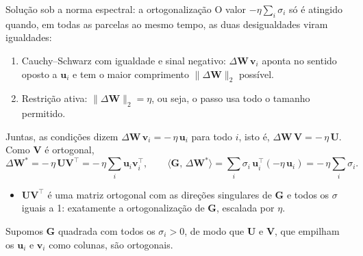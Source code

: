 \documentclass[aspectratio=169,xcolor=dvipsnames]{beamer}
\begin{document}
  \begin{frame}{Solução sob a norma espectral: a ortogonalização}
    O valor $-\eta\sum_{i}\sigma_{i}$ só é atingido quando, em \alert{todas} as parcelas ao mesmo tempo,
    as duas desigualdades viram igualdades:
    \begin{enumerate}
      \item Cauchy--Schwarz com igualdade e sinal negativo: $\Delta \mathbf{W}\,\mathbf{v}_{i}$ aponta no sentido
        oposto a $\mathbf{u}_{i}$ e tem o maior comprimento $\|\Delta \mathbf{W}\|_{2}$ possível.
      \item Restrição ativa: $\|\Delta \mathbf{W}\|_{2}=\eta$, ou seja, o passo usa todo o tamanho permitido.
    \end{enumerate}
    Juntas, as condições dizem $\Delta \mathbf{W}\,\mathbf{v}_{i}=-\,\eta\,\mathbf{u}_{i}$ para todo $i$, isto é,
    $\Delta \mathbf{W}\,\mathbf{V}=-\,\eta\,\mathbf{U}$. Como $\mathbf{V}$ é ortogonal,
    \[
      \Delta \mathbf{W}^{*}=-\,\eta\,\mathbf{U}\mathbf{V}^{\top}=-\,\eta\sum_{i}\mathbf{u}_{i}\mathbf{v}_{i}^{\top},
      \qquad
      \langle \mathbf{G},\,\Delta \mathbf{W}^{*}\rangle=\sum_{i}\sigma_{i}\,\mathbf{u}_{i}^{\top}(-\eta\,\mathbf{u}_{i})=-\,\eta\sum_{i}\sigma_{i}.
    \]
    \begin{itemize}
      \item $\mathbf{U}\mathbf{V}^{\top}$ é uma matriz ortogonal com as direções singulares de $\mathbf{G}$ e todos
        os $\sigma$ iguais a 1: exatamente a \alert{ortogonalização} de $\mathbf{G}$, escalada por $\eta$.
    \end{itemize}
    \vfill
    {\footnotesize\color{gray!50!black}Supomos $\mathbf{G}$ quadrada com todos os $\sigma_{i}>0$, de modo que
    $\mathbf{U}$ e $\mathbf{V}$, que empilham os $\mathbf{u}_{i}$ e $\mathbf{v}_{i}$ como colunas, são ortogonais.}
  \end{frame}
\end{document}
